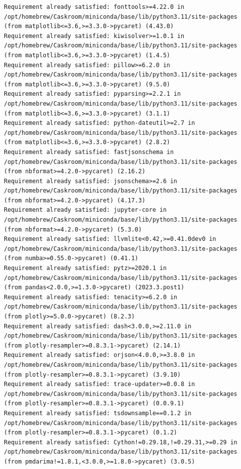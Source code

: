 \documentclass[
  letterpaper,
  DIV=11,
  numbers=noendperiod]{scrartcl}
\begin{document}
\begin{verbatim}
Requirement already satisfied: fonttools>=4.22.0 in /opt/homebrew/Caskroom/miniconda/base/lib/python3.11/site-packages (from matplotlib<=3.6,>=3.3.0->pycaret) (4.43.0)
Requirement already satisfied: kiwisolver>=1.0.1 in /opt/homebrew/Caskroom/miniconda/base/lib/python3.11/site-packages (from matplotlib<=3.6,>=3.3.0->pycaret) (1.4.5)
Requirement already satisfied: pillow>=6.2.0 in /opt/homebrew/Caskroom/miniconda/base/lib/python3.11/site-packages (from matplotlib<=3.6,>=3.3.0->pycaret) (9.5.0)
Requirement already satisfied: pyparsing>=2.2.1 in /opt/homebrew/Caskroom/miniconda/base/lib/python3.11/site-packages (from matplotlib<=3.6,>=3.3.0->pycaret) (3.1.1)
Requirement already satisfied: python-dateutil>=2.7 in /opt/homebrew/Caskroom/miniconda/base/lib/python3.11/site-packages (from matplotlib<=3.6,>=3.3.0->pycaret) (2.8.2)
Requirement already satisfied: fastjsonschema in /opt/homebrew/Caskroom/miniconda/base/lib/python3.11/site-packages (from nbformat>=4.2.0->pycaret) (2.16.2)
Requirement already satisfied: jsonschema>=2.6 in /opt/homebrew/Caskroom/miniconda/base/lib/python3.11/site-packages (from nbformat>=4.2.0->pycaret) (4.17.3)
Requirement already satisfied: jupyter-core in /opt/homebrew/Caskroom/miniconda/base/lib/python3.11/site-packages (from nbformat>=4.2.0->pycaret) (5.3.0)
Requirement already satisfied: llvmlite<0.42,>=0.41.0dev0 in /opt/homebrew/Caskroom/miniconda/base/lib/python3.11/site-packages (from numba>=0.55.0->pycaret) (0.41.1)
Requirement already satisfied: pytz>=2020.1 in /opt/homebrew/Caskroom/miniconda/base/lib/python3.11/site-packages (from pandas<2.0.0,>=1.3.0->pycaret) (2023.3.post1)
Requirement already satisfied: tenacity>=6.2.0 in /opt/homebrew/Caskroom/miniconda/base/lib/python3.11/site-packages (from plotly>=5.0.0->pycaret) (8.2.3)
Requirement already satisfied: dash<3.0.0,>=2.11.0 in /opt/homebrew/Caskroom/miniconda/base/lib/python3.11/site-packages (from plotly-resampler>=0.8.3.1->pycaret) (2.14.1)
Requirement already satisfied: orjson<4.0.0,>=3.8.0 in /opt/homebrew/Caskroom/miniconda/base/lib/python3.11/site-packages (from plotly-resampler>=0.8.3.1->pycaret) (3.9.10)
Requirement already satisfied: trace-updater>=0.0.8 in /opt/homebrew/Caskroom/miniconda/base/lib/python3.11/site-packages (from plotly-resampler>=0.8.3.1->pycaret) (0.0.9.1)
Requirement already satisfied: tsdownsample==0.1.2 in /opt/homebrew/Caskroom/miniconda/base/lib/python3.11/site-packages (from plotly-resampler>=0.8.3.1->pycaret) (0.1.2)
Requirement already satisfied: Cython!=0.29.18,!=0.29.31,>=0.29 in /opt/homebrew/Caskroom/miniconda/base/lib/python3.11/site-packages (from pmdarima!=1.8.1,<3.0.0,>=1.8.0->pycaret) (3.0.5)

\end{verbatim}
\end{document}

